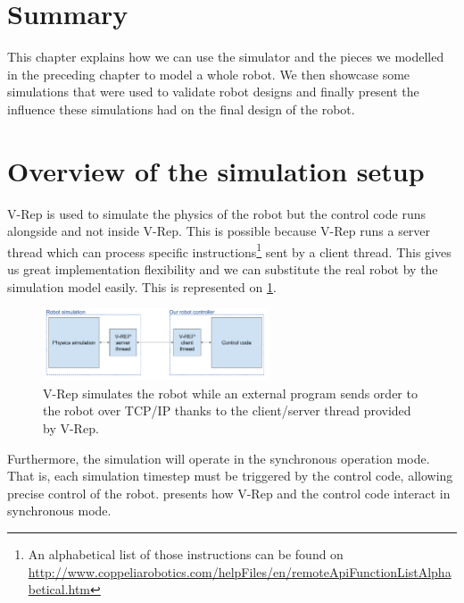 \section*{Summary}
This chapter explains how we can use the simulator and the pieces we modelled in the preceding chapter to model a whole robot. We then showcase some simulations that were used to validate robot designs and finally present the influence these simulations had on the final design of the robot. 

\section{Overview of the simulation setup}
V-Rep is used to simulate the physics of the robot but the control code runs alongside and not inside V-Rep. This is possible because V-Rep runs a server thread which can process specific instructions\footnote{An alphabetical list of those instructions can be found on \url{http://www.coppeliarobotics.com/helpFiles/en/remoteApiFunctionListAlphabetical.htm}} sent by a client thread. This gives us great implementation flexibility and we can substitute the real robot by the simulation model easily. This is represented on \cref{fig:simulation_principles}.

\begin{figure}[htp]
\center
\includegraphics[width=0.6\textwidth]{figures/simulation_principles}
\caption[Simulation principles]{V-Rep simulates the robot while an external program sends order to the robot over TCP/IP thanks to the client/server thread provided by V-Rep.}
\label{fig:simulation_principles}
\end{figure}

Furthermore, the simulation will operate in the synchronous operation mode. That is, each simulation timestep must be triggered by the control code, allowing precise control of the robot.  presents how V-Rep and the control code interact in synchronous mode.


